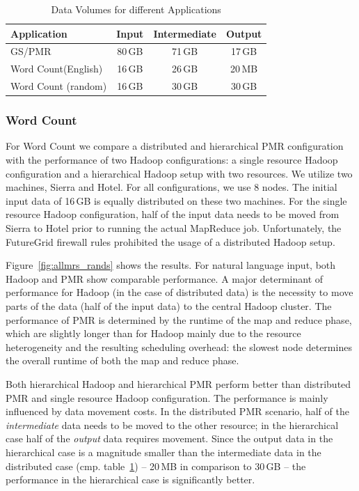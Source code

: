 \documentclass{acm_proc_article-sp}
\newcommand{\upp}{\vspace*{-0.5em}}
\begin{document}
\begin{table}[ht]
	\centering
\begin{tabular}{|p{2cm}|c|c|c|}
\hline
\textbf{Application} &\textbf{Input} &\textbf{Intermediate} &\textbf{Output}\\
\hline
GS/PMR 		&80\,GB &71\,GB		 &17\,GB\\
\hline
Word Count\linebreak[4] (English) &16\,GB&26\,GB&20\,MB\\
\hline
Word Count (random) &16\,GB&30\,GB&30\,GB\\
\hline
\end{tabular}
\caption{Data Volumes for different Applications\upp}
\label{tab:data-volumes}
\end{table}

\upp\upp
\subsubsection*{Word Count}

For Word Count we compare a distributed and hierarchical PMR
configuration with the performance of two Hadoop configurations: a
single resource Hadoop configuration and a hierarchical Hadoop setup
with two resources. We utilize two machines, Sierra and Hotel. For all
configurations, we use 8 nodes. The initial input data of 16\,GB is
equally distributed on these two machines. For the single resource
Hadoop configuration, half of the input data needs to be moved from
Sierra to Hotel prior to running the actual MapReduce
job. Unfortunately, the FutureGrid firewall rules prohibited the usage
of a distributed Hadoop setup.

Figure~\ref{fig:allmrs_rands} shows the results. For natural language
input, both Hadoop and PMR show comparable performance. A major
determinant of performance for Hadoop (in the case of distributed
data) is the necessity to move parts of the data (half of the input
data) to the central Hadoop cluster. The performance of PMR is
determined by the runtime of the map and reduce phase, which are
slightly longer than for Hadoop mainly due to the resource
heterogeneity and the resulting scheduling overhead: the slowest node
determines the overall runtime of both the map and reduce phase.

Both hierarchical Hadoop and hierarchical PMR perform better than
distributed PMR and single resource Hadoop configuration. The
performance is mainly influenced by data movement costs. In the
distributed PMR scenario, half of the {\it intermediate} data needs to
be moved to the other resource; in the hierarchical case half of the
{\it output} data requires movement. Since the output data in the
hierarchical case is a magnitude smaller than the intermediate data in
the distributed case (cmp. table~\ref{tab:data-volumes}) -- 20\,MB in
comparison to 30\,GB -- the performance in the hierarchical case is
significantly better.
\end{document}
